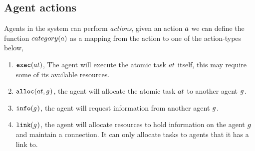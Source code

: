 \subsection{Agent actions}

Agents in the system can perform \textit{actions}, given an action $\varAction{}{}$ we can define the function $\functionAgentActionType{}{}$ as a mapping from the action to one of the action-types below, 

\begin{enumerate}
	\item $\functionExec{}{}$, The agent will execute the atomic task $\varAtomicTask{}{}$ itself, this may require some of its available resources.
	\item $\functionAlloc{}{}$, the agent will allocate the atomic task $\varAtomicTask{}{}$ to another agent $g_{}^{}$.
	\item $\functionInfo{}{}$, the agent will request information from another agent $g_{}^{}$.
	\item $\functionLink{}{}$, the agent will allocate resources to hold information on the agent $g_{}^{}$ and maintain a connection. It can only allocate tasks to agents that it has a link to.
\end{enumerate}